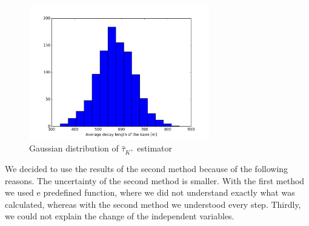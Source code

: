 \documentclass[10pt,a4paper]{report}
\begin{document}
\begin{figure}[htbp] 
  \centering
     \includegraphics[width=0.7\textwidth]{hist_tau_estimator3.jpg}
  \caption{Gaussian distribution of $\hat{\tau}_{K^+}$ estimator}
  \label{fig:Bild1}
\end{figure}

We decided to use the results of the second method because of the following reasons. The uncertainty of the second method is smaller. With the first method we used e predefined function, where we did not understand exactly what was calculated, whereas with the second method we understood every step. Thirdly, we could not explain the change of the independent variables. 
\end{document}
